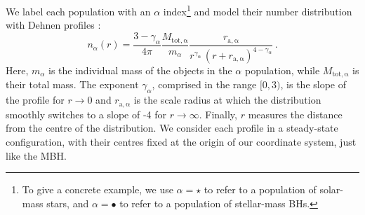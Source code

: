 \documentclass[desactivate]{aa}
\newcommand{\lb}[1]{\textcolor{orange}{#1}}
\newcommand{\as}[1]{\textcolor{red}{AS: #1}}
\begin{document}
        We label each population with an $\alpha$ index\footnote{To give a concrete example, we use $\alpha = \star$ to refer to a population of solar-mass stars, and $\alpha = \bullet$ to refer to a population of stellar-mass BHs.} and model their number distribution with Dehnen profiles \citep{1993MNRAS.265..250D,1994AJ....107..634T}:
        \begin{equation} \label{eq:n}
            n_\alpha (r) = \frac{3-\gamma_\alpha}{4\pi}\frac{M_\mathrm{tot,\alpha}}{m_\alpha}\frac{r_\mathrm{a,\alpha}}{r^{\gamma_\alpha} \, (r+r_\mathrm{a,\alpha})^{4-\gamma_\alpha}} \, .
        \end{equation}
        Here, $m_\alpha$ is the individual mass of the objects in the $\alpha$ population, while $M_\mathrm{tot,\alpha}$ is their total mass. The exponent $\gamma_\alpha$, comprised in the range $[0,3)$, is the slope of the profile for $r \to 0$ and $r_\mathrm{a,\alpha}$ is the scale radius at which the distribution smoothly switches to a slope of -4 for $r \to \infty$. Finally, $r$ measures the distance from the centre of the distribution. We consider each profile in a steady-state configuration, with their centres fixed at the origin of our coordinate system, just like the MBH.
\end{document}
